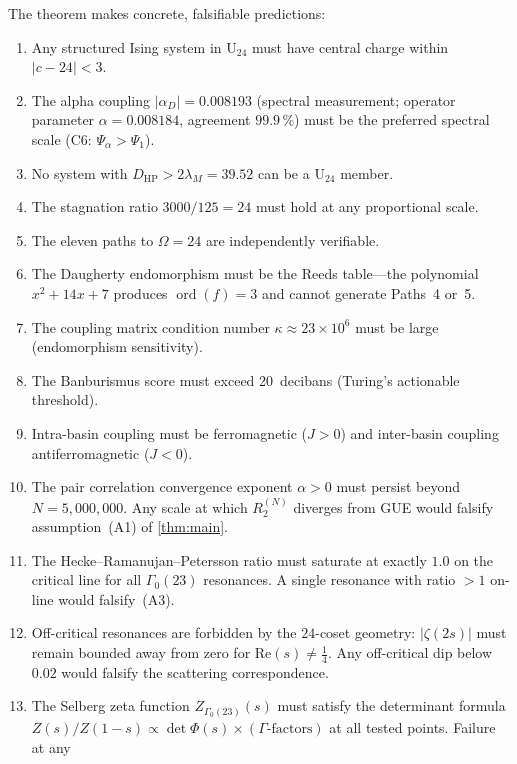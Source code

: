 \documentclass[11pt,a4paper]{article}
\theoremstyle{plain}
\theoremstyle{remark}
\renewcommand{\Omega}{\varOmega}
\newcommand{\ord}{\operatorname{ord}}
\begin{document}
The theorem makes concrete, falsifiable predictions:

\begin{enumerate}[itemsep=3pt]
  \item Any structured Ising system in $\mathrm{U}_{24}$ must have central
        charge within $|c-24|<3$.
  \item The alpha coupling $|\alpha_D|=0.008193$ (spectral measurement;
        operator parameter $\alpha=0.008184$, agreement $99.9\,\%$) must be
        the preferred spectral scale (C6: $\Psi_\alpha>\Psi_1$).
  \item No system with $D_{\mathrm{HP}}>2\lambda_M=39.52$ can be a
        $\mathrm{U}_{24}$ member.
  \item The stagnation ratio $3000/125=24$ must hold at any proportional scale.
  \item The eleven paths to $\Omega=24$ are independently verifiable.
  \item The Daugherty endomorphism must be the Reeds table---the polynomial
        $x^2+14x+7$ produces $\ord(f)=3$ and cannot generate Paths~4 or~5.
  \item The coupling matrix condition number
        $\kappa\approx 23\times 10^6$ must be large (endomorphism sensitivity).
  \item The Banburismus score must exceed 20~decibans (Turing's actionable
        threshold).
  \item Intra-basin coupling must be ferromagnetic ($J>0$) and inter-basin
        coupling antiferromagnetic ($J<0$).
  \item The pair correlation convergence exponent $\alpha>0$ must persist
        beyond $N=5{,}000{,}000$.  Any scale at which $R_2^{(N)}$ diverges
        from GUE would falsify assumption~(A1) of \cref{thm:main}.
  \item The Hecke--Ramanujan--Petersson ratio must saturate at exactly $1.0$
        on the critical line for all $\Gamma_0(23)$ resonances.  A single
        resonance with ratio ${}>1$ on-line would falsify~(A3).
  \item Off-critical resonances are forbidden by the $24$-coset geometry:
        $|\zeta(2s)|$ must remain bounded away from zero for
        $\mathrm{Re}(s)\neq\tfrac{1}{4}$.  Any off-critical dip below $0.02$
        would falsify the scattering correspondence.
  \item The Selberg zeta function $Z_{\Gamma_0(23)}(s)$ must satisfy the
        determinant formula $Z(s)/Z(1{-}s) \propto \det\Phi(s)\times
        (\text{$\Gamma$-factors})$ at all tested points.  Failure at any

\end{enumerate}
\end{document}
